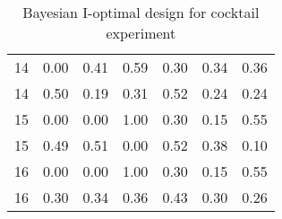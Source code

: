 \begin{table}[ht]
\begin{tabular}{lrrrrrr}
  14 & 0.00 & 0.41 & 0.59 & 0.30 & 0.34 & 0.36 \\ 
  14 & 0.50 & 0.19 & 0.31 & 0.52 & 0.24 & 0.24 \\ 
  15 & 0.00 & 0.00 & 1.00 & 0.30 & 0.15 & 0.55 \\ 
  15 & 0.49 & 0.51 & 0.00 & 0.52 & 0.38 & 0.10 \\ 
  16 & 0.00 & 0.00 & 1.00 & 0.30 & 0.15 & 0.55 \\ 
  16 & 0.30 & 0.34 & 0.36 & 0.43 & 0.30 & 0.26 \\ 
   \hline
\end{tabular}
\caption{Bayesian I-optimal design for cocktail experiment} 
\label{tab:cocktail_exp_i_optimal_des}
\end{table}
